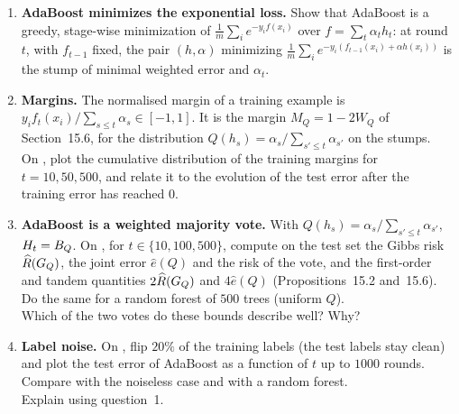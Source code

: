 \documentclass[a4paper,11pt]{article}
\begin{document}
\label{p3:far}

\begin{enumerate}
\item \textbf{AdaBoost minimizes the exponential loss.} Show that AdaBoost is a greedy, stage-wise minimization of
      $\frac1m\sum_ie^{-y_if(x_i)}$ over $f=\sum_t\alpha_th_t$: at round $t$, with $f_{t-1}$ fixed, the pair $(h,\alpha)$
      minimizing $\frac1m\sum_ie^{-y_i(f_{t-1}(x_i)+\alpha h(x_i))}$ is the stump of minimal weighted error and $\alpha_t$.
\item \textbf{Margins.} The normalised margin of a training example is $y_if_t(x_i)/\sum_{s\leq t}\alpha_s\in[-1,1]$.
      It is the margin $M_Q=1-2W_Q$ of Section~15.6, for the distribution $Q(h_s)=\alpha_s/\sum_{s'\leq t}\alpha_{s'}$ on
      the stumps.\\
      On , plot the cumulative distribution of the training margins for $t=10,50,500$, and relate it to the
      evolution of the test error after the training error has reached $0$.
\item \textbf{AdaBoost is a weighted majority vote.} With $Q(h_s)=\alpha_s/\sum_{s'\leq t}\alpha_{s'}$, $H_t=B_{Q}$.
      On , for $t\in\{10,100,500\}$, compute on the test set the Gibbs risk $\widehat R(G_{Q})$, the joint error
      $\hat e(Q)$ and the risk of the vote, and the first-order and tandem quantities $2\widehat R(G_{Q})$ and $4\hat e(Q)$
      (Propositions~15.2 and~15.6).\\
      Do the same for a random forest of $500$ trees (uniform $Q$).\\
      Which of the two votes do these bounds describe well? Why?
\item \textbf{Label noise.} On , flip $20\%$ of the training labels (the test labels stay clean) and
      plot the test error of AdaBoost as a function of $t$ up to $1000$ rounds.\\
      Compare with the noiseless case and
      with a random forest.\\
      Explain using question~1.
\end{enumerate}
\end{document}
